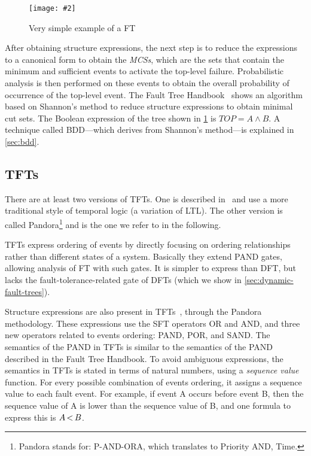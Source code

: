 \documentclass[12pt,openright,twoside,a4paper,oldfontcommands,english,brazil,final]{abntex2}
\theoremstyle{theo}
\newcommand{\includegraphicsaspectratio}[2][1]{%
  \texttt{[image: \#2]}%
}
\def\FThandbook{Fault Tree Handbook~\cite{VGR+1981}\index{Fault Tree!Handbook}%
  \gdef\FThandbook{Fault Tree Handbook\index{Fault Tree!Handbook}\xspace}%
  \xspace}
\def\pandora{Pandora\footnote{Pandora stands for: P-AND-ORA, which translates to Priority AND, Time.}%
  \gdef\pandora{Pandora\xspace}%
  \xspace}
\def\pand{\ensuremath\operatorname{<}}
\begin{document}
\begin{figure}[htb]
  \centering
  \includegraphicsaspectratio[0.45]{ex-fault-tree1}
  \caption{Very simple example of a \acl{FT}}
  \label{fig:ex-fault-tree1}
\end{figure}

After obtaining structure expressions, the next step is to reduce the expressions to a canonical form to obtain the \emph{\acp{MCS}}, which are the sets that contain the minimum and sufficient events to activate the top-level failure.
Probabilistic analysis is then performed on these events to obtain the overall probability of occurrence of the top-level event.
The \FThandbook shows an algorithm based on Shannon's method to reduce structure expressions to obtain minimal cut sets.
The Boolean expression of the tree shown in \cref{fig:ex-fault-tree1} is $TOP = A \wedge B$.
A technique called \ac{BDD}---which derives from Shannon's method---is explained in \cref{sec:bdd}.

\subsection{\Aclp*{TFT}}
\label{sec:temporal-fault-trees}

There are at least two versions of \acp{TFT}.
One is described in~\cite{Palshikar2002} and use a more traditional style of temporal logic (a variation of \ac{LTL}).
The other version is called \pandora and is the one we refer to in the following.

\Acp{TFT} express ordering of events by directly focusing on ordering relationships rather than different states of a system. Basically they extend  \ac{PAND} gates, allowing analysis of \ac{FT} with such gates.
It is simpler to express than \ac{DFT}, but lacks the fault-tolerance-related gate of \acp{DFT} (which we show in \cref{sec:dynamic-fault-trees}).

\begin{sloppypar}
Structure expressions are also present in \acp{TFT}~\cite{WP2009,Walker2009,WP2010}, through the \pandora methodology.
These expressions use the \ac{SFT} operators \ac{OR} and \ac{AND}, and three new operators related to events ordering: \acf{PAND}, \ac{POR}, and \ac{SAND}.
The semantics of the \ac{PAND} in \acp{TFT} is similar to the semantics of the \ac{PAND} described in the \FThandbook.
To avoid ambiguous expressions, the semantics in \acp{TFT} is stated in terms of natural numbers, using a \emph{sequence value} function.
For every possible combination of events ordering, it assigns a sequence value to each fault event.
For example, if event A occurs before event B, then the sequence value of A is lower than the sequence value of B, and one formula to express this is $A \pand B$.
\end{sloppypar}
\end{document}
